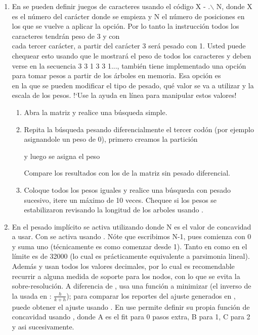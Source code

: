 \begin{enumerate}
	\item En 
	se pueden definir juegos de caracteres usando el c\'odigo X - .$\backslash$ N, donde X es el n\'umero del car\'acter donde se empieza y N el n\'umero de posiciones en los que se vuelve a aplicar la opci\'on. Por lo tanto la instrucci\'on  todos los caracteres tendr\'an peso de 3 y con \\ cada tercer car\'acter, a partir del car\'acter 3 ser\'a pesado con 1. Usted puede chequear esto usando  que le mostrar\'a el peso de todos los caracteres y deben verse en la secuencia 3 3 1 3 3 1...,
	tambi\'en tiene implementado una opci\'on para tomar pesos a partir de los \'arboles en memoria. Esa opci\'on es \\en la que se pueden modificar el tipo de pesado, qu\'e valor se va a utilizar y la escala de los pesos. !`Use la ayuda en l\'inea para manipular estos valores!
	\begin{enumerate}
		\item Abra la matriz y realice una b\'usqueda simple.
		\item Repita la b\'usqueda pesando diferencialmente el tercer cod\'on (por ejemplo asignandole un peso de 0), primero creamos la partici\'on

		y luego se asigna el peso 

		Compare los resultados con los de la matriz sin pesado diferencial.

		\item Coloque todos los pesos iguales y realice una b\'usqueda con pesado sucesivo, itere un m\'aximo de 10 veces. Chequee si los pesos se estabilizaron revisando la longitud de los arboles usando .
	\end{enumerate}
	
	\item En  el pesado impl\'icito se activa utilizando  donde N es el valor de concavidad a usar. Con  se activa usando . N\'ote que escribimos N-1, pues  comienza con 0 y suma uno (t\'ecnicamente es como comenzar desde 1). Tanto en  como en  el l\'imite es de 32000 (lo cual es pr\'acticamente equivalente a parsimonia lineal). Adem\'as  y  usan todos los valores decimales, por lo cual es recomendable recurrir a alguna medida de soporte para los nodos, con lo que se evita la sobre-resoluci\'on. A diferencia de ,  usa una funci\'on a minimizar (el inverso de la usada en : $\frac{h}{k + h}$); para comparar los reportes del ajuste generados en  , puede obtener el ajuste usando .  En   use 
	 permite definir su propia funci\'on de concavidad usando \Cmd{piwe [A B C...;}, donde A es el fit para 0 pasos extra, B para 1, C para 2 y asi sucesivamente. 


\end{enumerate}

